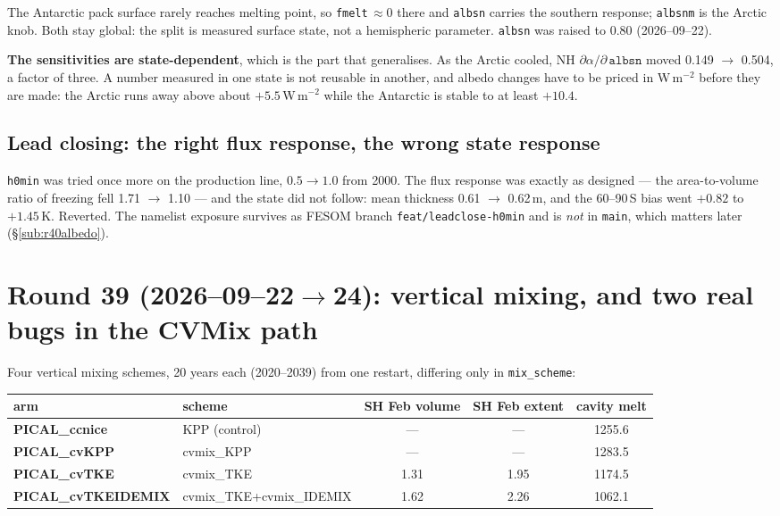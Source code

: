 \documentclass[10pt]{article}
\begin{document}
The Antarctic pack surface rarely reaches melting point, so \texttt{fmelt}$\,\approx0$ there and
\texttt{albsn} carries the southern response; \texttt{albsnm} is the Arctic knob. Both stay
global: the split is measured surface state, not a hemispheric parameter. \texttt{albsn} was
raised to 0.80 (2026--09--22).

\textbf{The sensitivities are state-dependent}, which is the part that generalises. As the
Arctic cooled, NH $\partial\alpha/\partial\,\texttt{albsn}$ moved 0.149 $\to$ 0.504, a factor of
three. A number measured in one state is not reusable in another, and albedo changes have to be
priced in W\,m$^{-2}$ before they are made: the Arctic runs away above about $+5.5$\,W\,m$^{-2}$
while the Antarctic is stable to at least $+10.4$.

\subsection{Lead closing: the right flux response, the wrong state response}\label{sub:r38h0}

\texttt{h0min} was tried once more on the production line, $0.5\to1.0$ from 2000. The flux
response was exactly as designed --- the area-to-volume ratio of freezing fell 1.71 $\to$ 1.10
--- and the state did not follow: mean thickness 0.61 $\to$ 0.62\,m, and the 60--90\,S bias went
$+0.82$ to $+1.45$\,K. Reverted. The namelist exposure survives as FESOM branch
\texttt{feat/leadclose-h0min} and is \emph{not} in \texttt{main}, which matters later
(\S\ref{sub:r40albedo}).

\section{Round 39 (2026--09--22$\to$24): vertical mixing, and two real bugs in the CVMix path}\label{sec:round39}

Four vertical mixing schemes, 20 years each (2020--2039) from one restart, differing only in
\texttt{mix\_scheme}:

\begin{center}
\begin{tabular}{llccc}
\hline
arm & scheme & SH Feb volume & SH Feb extent & cavity melt \\
\hline
\textbf{PICAL\_ccnice}     & KPP (control)          & ---  & ---  & 1255.6 \\
\textbf{PICAL\_cvKPP}      & cvmix\_KPP             & ---  & ---  & 1283.5 \\
\textbf{PICAL\_cvTKE}      & cvmix\_TKE             & 1.31 & 1.95 & 1174.5 \\
\textbf{PICAL\_cvTKEIDEMIX}& cvmix\_TKE+cvmix\_IDEMIX & 1.62 & 2.26 & 1062.1 \\
\hline
\end{tabular}
\end{center}
\end{document}
